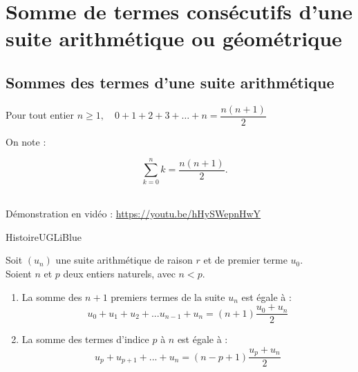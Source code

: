 \documentclass[a4paper,11pt,cours]{nsi} %
\begin{document}
\section{Somme de termes consécutifs d'une suite arithmétique ou géométrique}
\subsection*{Sommes des termes d'une suite arithmétique}
\begin{propriete}[]
	Pour tout entier $n\geqslant1, \quad 0+1+2+3+\ldots+n = \dfrac{n(n+1)}{2} $\\
	\begin{minipage}{2cm}
		On note :
	\end{minipage}
	\begin{minipage}{6cm}
		$$\quad\sum_{k=0}^n k = \dfrac{n(n+1)}{2}.$$
	\end{minipage} 
\end{propriete}
\begin{demonstration}
	\\
	Démonstration en vidéo : \href{https://youtu.be/hHySWepnHwY}{https://youtu.be/hHySWepnHwY}
\end{demonstration}	

\begin{encadrecolore}{Histoire}{UGLiBlue}
        
\end{encadrecolore}

\newpage

\begin{propriete}
	Soit $(u_n)$ une suite arithmétique de raison $r$ et de premier terme $u_0$.\\
	Soient $n$ et $p $ deux entiers naturels, avec $n<p$.
	\begin{enumerate}[label=\textbullet]
		\item La somme des $n+1$ premiers termes de la suite $u_n$ est égale à :
		$$u_0+u_1+u_2+...u_{n-1}+u_n=(n+1)\dfrac{u_0+u_n}{2}$$
		\item La somme des termes d'indice $p$ à $n$ est égale à :
		$$u_p+u_{p+1}+...+u_n=(n-p+1)\dfrac{u_p+u_n}{2}$$
	\end{enumerate}
\end{propriete}
\end{document}
